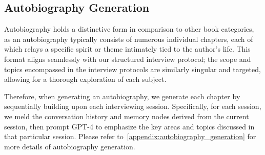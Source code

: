 \subsection{Autobiography Generation}


Autobiography holds a distinctive form in comparison to other book categories, as an autobiography typically consists of numerous individual chapters, each of which relays a specific spirit or theme intimately tied to the author's life. This format aligns seamlessly with our structured interview protocol; the scope and topics encompassed in the interview protocols are similarly singular and targeted, allowing for a thorough exploration of each subject.

Therefore, when generating an autobiography, we generate each 
chapter by sequentially building upon each interviewing session.
Specifically, for each session, we meld the conversation history and memory nodes derived from the current session, then prompt GPT-4 to emphasize the key areas and topics discussed in that particular session.
Please refer to~\cref{appendix:autobiography_generation} for more details of autobiography generation.

